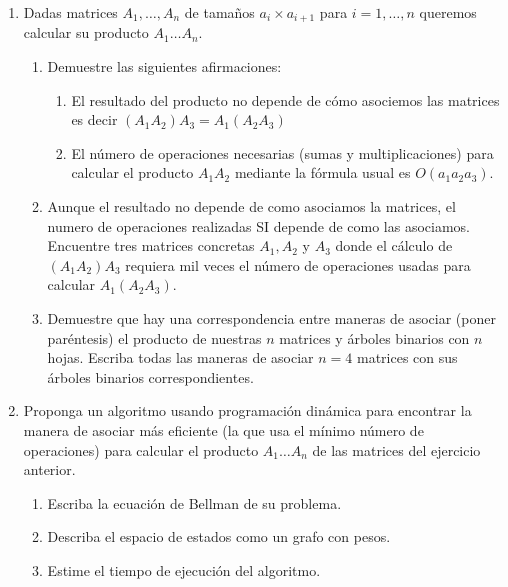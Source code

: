 \documentclass[12pt, a4paper]{article}
\begin{document}
\begin{enumerate}
\item Dadas matrices $A_1,\dots, A_n$ de tama\~nos $a_i\times a_{i+1}$ para $i=1,\dots,n$ queremos calcular su producto $A_1\dots A_n$.
\begin{enumerate}
\item Demuestre las siguientes afirmaciones:\begin{enumerate}
\item  El resultado del producto no depende de cómo asociemos las matrices es decir $(A_1A_2)A_3=A_1(A_2A_3)$
\item El n\'umero de operaciones necesarias (sumas y multiplicaciones) para calcular el producto $A_1A_2$ mediante la fórmula usual es $O(a_1a_2a_3)$.
\end{enumerate}
\item Aunque el resultado no depende de como asociamos la matrices, el numero de operaciones realizadas SI depende de como las asociamos. Encuentre tres matrices concretas $A_1,A_2$ y $A_3$ donde el cálculo de $(A_1A_2)A_3$ requiera mil veces el número de operaciones usadas para calcular $A_1(A_2A_3)$. 
\item Demuestre que hay una correspondencia entre maneras de asociar (poner paréntesis) el producto de nuestras $n$ matrices y árboles binarios con $n$ hojas. Escriba todas las maneras de asociar $n=4$ matrices con sus árboles binarios correspondientes.
\end{enumerate}

\item Proponga un algoritmo usando programación dinámica para encontrar la manera de asociar más eficiente (la que usa el mínimo número de operaciones) para calcular el producto $A_1\dots A_n$ de las matrices del ejercicio anterior.
\begin{enumerate}
\item Escriba la ecuación de Bellman de su problema.
\item Describa el espacio de estados como un grafo con pesos.
\item Estime el tiempo de ejecución del algoritmo.
\end{enumerate}


\end{enumerate}
\end{document}

